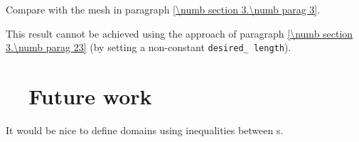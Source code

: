 Compare with the mesh in paragraph \ref{\numb section 3.\numb parag 3}.

This result cannot be achieved using the approach of paragraph
\ref{\numb section 3.\numb parag 23} (by setting a non-constant {\small\tt desired\_\,length}).


\section{~~Future work}\label{\numb section 3.\numb parag 26}

It would be nice to define domains using inequalities between {\small\tt{}}s.

